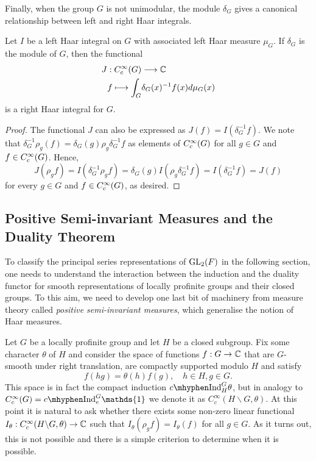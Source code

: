 Finally, when the group $G$ is not unimodular, the module $\delta_G$ gives a canonical relationship between left and right Haar integrals.

\begin{lemma}
    Let $I$ be a left Haar integral on $G$ with associated left Haar measure $\mu_G$. If $\delta_G$ is the module of $G$, then the functional
    \begin{align*}
        J:C_c^{\infty}(G)&\longrightarrow\mathbb{C}\\
        f\longmapsto\int_G& \delta_G(x)^{-1}f(x)d\mu_G(x)
    \end{align*}
    is a right Haar integral for $G$.
\end{lemma}
\begin{proof}
    The functional $J$ can also be expressed as $J(f)=I(\delta_G^{-1}f)$. We note that $\delta_G^{-1}\rho_g(f)=\delta_G(g)\rho_g\delta_G^{-1}f$ as elements of $C_c^{\infty}(G)$ for all $g\in G$ and $f\in C_c^{\infty}(G)$.  Hence, 
    $$J(\rho_g f)=I(\delta_G^{-1}\rho_g f)=\delta_G(g)I(\rho_g\delta_G^{-1}f)=I(\delta^{-1}_G f)=J(f)$$
    for every $g\in G$ and $f\in C_c^{\infty}(G)$, as desired.
\end{proof}

\subsection{Positive Semi-invariant Measures and the Duality Theorem}

To classify the principal series representations of $\mathrm{GL}_2(F)$ in the following section, one needs to understand the interaction between the induction and the duality functor for smooth representations of locally profinite groups and their closed groups. To this aim, we need to develop one last bit of machinery from measure theory called \textit{positive semi-invariant measures}, which generalise the notion of Haar measures.

Let $G$ be a locally profinite group and let $H$ be a closed subgroup. Fix some character $\theta$ of $H$ and consider the space of functions $f:G\to\mathbb{C}$ that are $G$-smooth under right translation, are compactly supported modulo $H$ and satisfy $$f(hg)=\theta(h)f(g),\quad h\in H,g\in G.$$
This space is in fact the compact induction $\cInd_H^G\theta$, but in analogy to $\CG=\cInd_{e}^G\mathds{1}$ we denote it as $C_c^{\infty}(H\backslash G,\theta)$. At this point it is natural to ask whether there exists some non-zero linear functional $I_{\theta}:C_c^{\infty}(H\backslash G,\theta)\to\mathbb{C}$ such that $I_{\theta}(\rho_g f)=I_{\theta}(f)$ for all $g\in G$. As it turns out, this is not possible and there is a simple criterion to determine when it is possible.

